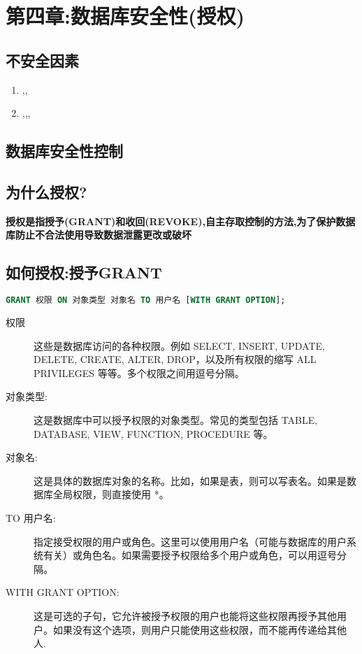  

\section{第四章:数据库安全性(授权)}
\subsection{不安全因素}
\begin{enumerate}
    \item ,,
    \item ,,,
\end{enumerate}
\subsection{数据库安全性控制}

\subsection{\color{red}\textbf{为什么授权?}}
\textbf{授权是指授予(GRANT)和收回(REVOKE),自主存取控制的方法,为了保护数据库防止不合法使用导致数据泄露更改或破坏}

\subsection{\color{red}\textbf{如何授权:授予GRANT}}
\begin{lstlisting}[language=SQL]
    GRANT 权限 ON 对象类型 对象名 TO 用户名 [WITH GRANT OPTION];
\end{lstlisting}
\begin{description}
    \item[权限] 这些是数据库访问的各种权限。例如 SELECT, INSERT, UPDATE, DELETE, CREATE, ALTER, DROP，以及所有权限的缩写 ALL PRIVILEGES 等等。多个权限之间用逗号分隔。
    \item[对象类型:] 这是数据库中可以授予权限的对象类型。常见的类型包括 TABLE, DATABASE, VIEW, FUNCTION, PROCEDURE 等。
    \item[对象名:] 这是具体的数据库对象的名称。比如，如果是表，则可以写表名。如果是数据库全局权限，则直接使用 *。
    \item[TO 用户名:] 指定接受权限的用户或角色。这里可以使用用户名（可能与数据库的用户系统有关）或角色名。如果需要授予权限给多个用户或角色，可以用逗号分隔。
    \item[WITH GRANT OPTION:] 这是可选的子句，它允许被授予权限的用户也能将这些权限再授予其他用户。如果没有这个选项，则用户只能使用这些权限，而不能再传递给其他人.
\end{description}

